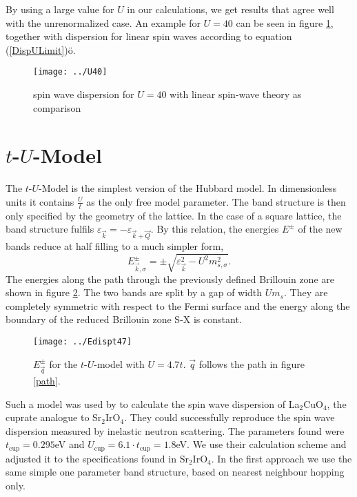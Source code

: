 By using a large value for $U$ in our calculations, we get results that agree well with the unrenormalized case.
An example for $U=40$ can be seen in figure \ref{largeU}, together with dispersion for linear spin waves according to equation (\ref{DispULimit})ö.
%
\begin{figure}
 \begin{center}
  \texttt{[image: ../U40]}
  \caption{spin wave dispersion for $U=40$ with linear spin-wave theory as comparison}
 \label{largeU}
  \end{center}
\end{figure}
%
  
\newpage

\section{$t$-$U$-Model}

The $t$-$U$-Model is the simplest version of the Hubbard model.
In dimensionless units it contains $\frac{U}{t}$ as the only free model parameter.
The band structure is then only specified by the geometry of the lattice.
In the case of a square lattice, the band structure fulfils $\varepsilon_{\vec k} = -\varepsilon_{\vec k+\vec Q}$.
By this relation, the energies $E^{\pm}$ of the new bands reduce at half filling to a much simpler form,
\begin{equation}
 E^{\pm}_{\vec k,\sigma} = \pm \sqrt{\varepsilon_{\vec k}^2 -U^2m_{s,\sigma}^2}.
\end{equation}
The energies along the path through the previously defined Brillouin zone are shown in figure \ref{Epmt47}.
The two bands are split by a gap of width $Um_s$. 
They are completely symmetric with respect to the Fermi surface and the energy along the boundary of the reduced Brillouin zone S-X is constant.
%
\begin{figure}
 \centering
 \texttt{[image: ../Edispt47]}
 \caption{$E^{\pm}_{\vec q}$ for the $t$-$U$-model with $U=4.7t$. $\vec q$ follows the path in figure \ref{path}.}
 \label{Epmt47}
\end{figure}


Such a model was used by \citet{PhysRevB.65.132404} to calculate the spin wave dispersion of La$_2$CuO$_4$, the cuprate analogue to Sr$_2$IrO$_4$.
They could successfully reproduce the spin wave dispersion measured by inelastic neutron scattering. 
The parameters found were $t_{\mathrm{cup}}=0.295$eV and $U_{\mathrm{cup}}=6.1\cdot t_{\mathrm{cup}}=1.8$eV. 
We use their calculation scheme and adjusted it to the specifications found in Sr$_2$IrO$_4$.
In the first approach we  use the same simple one parameter band structure, based on nearest neighbour hopping only.

